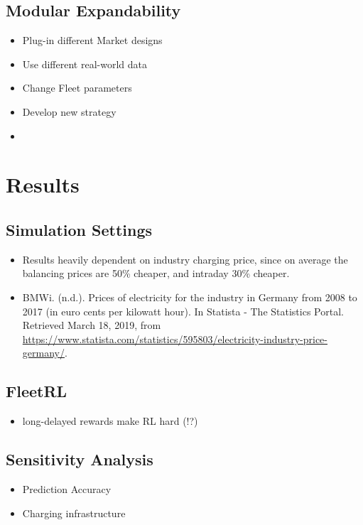 \documentclass[a4paper, 12pt]{article}
\begin{document}
\subsection{Modular Expandability}
\label{sec:org21b5f0e}
\begin{itemize}
\item Plug-in different Market designs
\item Use different real-world data
\item Change Fleet parameters
\item Develop new strategy
\item
\end{itemize}

\clearpage
\section{Results}
\label{sec:orgd5b69ea}
\subsection{Simulation Settings}
\label{sec:orga7ac8fb}
\begin{itemize}
\item Results heavily dependent on industry charging price, since on average the
balancing prices are 50\% cheaper, and intraday 30\% cheaper.
\item BMWi. (n.d.). Prices of electricity for the industry in Germany from 2008 to
2017 (in euro cents per kilowatt hour). In Statista - The Statistics Portal.
Retrieved March 18, 2019, from
\url{https://www.statista.com/statistics/595803/electricity-industry-price-germany/}.
\end{itemize}
\subsection{FleetRL}
\label{sec:orgd10220f}
\begin{itemize}
\item long-delayed rewards make RL hard (!?)
\end{itemize}
\subsection{Sensitivity Analysis}
\label{sec:orgc9aecc9}
\begin{itemize}
\item Prediction Accuracy
\end{itemize}

\begin{itemize}
\item Charging infrastructure
\end{itemize}
\end{document}
